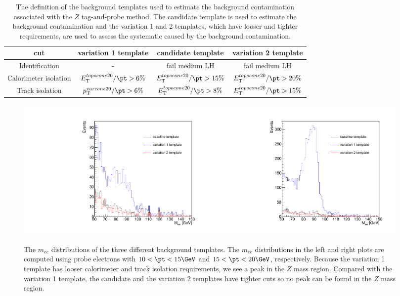 \begin{table}[htbp]
\begin{center}
\begin{tabular}{cccc}
\hline
\hline
cut & variation 1 template & candidate template & variation 2 template\\
\hline
Identification & - & fail medium LH & fail medium LH\\
Calorimeter isolation & $E_{\text T}^{topocone20} /\pt>6\%$ & $E_{\text T}^{topocone20} /\pt>15\%$ & $E_{\text T}^{topocone20} /\pt>20\%$\\
Track isolation & $p_{\text T}^{varcone20} /\pt>6\%$ & $E_{\text T}^{topocone20} /\pt>8\%$ & $E_{\text T}^{topocone20} /\pt>15\%$\\
\hline
\hline
\end{tabular}
\end{center}
\caption{The definition of the background templates used to estimate the background contamination associated with the $Z$ tag-and-probe method.
The candidate template is used to estimate the background contamination and the variation 1 and 2 templates, which have looser and tighter requirements, are used to assess the systematic caused by the background contamination.}
\label{tab:RLE_bkg_templates}
\end{table}

\begin{figure}[htbp]
\includegraphics[width=0.48\textwidth]{bkg_template_electron_pt_1015_eta0201.pdf}
\includegraphics[width=0.48\textwidth]{bkg_template_electron_pt_1520_eta0201.pdf}
\caption{The $m_{ee}$ distributions of the three different background templates.
The $m_{ee}$ distributions in the left and right plots are computed using probe electrons with $10<\pt<15 \GeV$ and $15<\pt<20 \GeV$, respectively.
Because the variation 1 template has looser calorimeter and track isolation requirements, we see a peak in the $Z$ mass region.
Compared with the variation 1 template, the candidate and the variation 2 templates have tighter cuts so no peak can be found in the $Z$ mass region.}
\label{fig:RLE_bkg_templates}
\end{figure}

